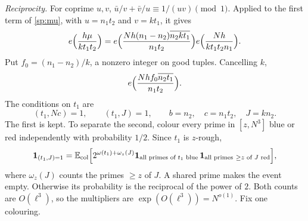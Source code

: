 \emph{Reciprocity.} For coprime $u,v$, $\bar u/v+\bar v/u\equiv1/(uv)\pmod1$.
Applied to the first term of \eqref{sp:mu}, with $u=n_1t_2$ and $v=kt_1$, it
gives
\[
 e\Bigl(\frac{h\mu}{kt_1t_2}\Bigr)
 =e\Bigl(\frac{Nh(n_1-n_2)\overline{n_2kt_1}}{n_1t_2}\Bigr)
  e\Bigl(\frac{Nh}{kt_1t_2n_1}\Bigr).
\]
Put $f_0=(n_1-n_2)/k$, a nonzero integer on good tuples. Cancelling $k$,
\begin{equation}\label{sp:phase}
 e\Bigl(\frac{Nhf_0\overline{n_2t_1}}{n_1t_2}\Bigr).
\end{equation}
The conditions on $t_1$ are
\begin{equation}\label{sp:inner-cond}
 (t_1,Nc)=1,\qquad(t_1,J)=1,\qquad b=n_2,\quad c=n_1t_2,\quad J=kn_2 .
\end{equation}
The first is kept. To separate the second, colour every prime in
$[z,N^3]$ blue or red independently with probability $1/2$. Since $t_1$ is
$z$-rough,
\begin{equation}\label{sp:colour}
 \mathbf1_{(t_1,J)=1}=\mathbb E_{\rm col}\Bigl[2^{\omega(t_1)+\omega_z(J)}
 \mathbf1_{\text{all primes of }t_1\text{ blue}}\,
 \mathbf1_{\text{all primes}\ \ge z\text{ of }J\text{ red}}\Bigr],
\end{equation}
where $\omega_z(J)$ counts the primes $\ge z$ of $J$. A shared prime makes
the event empty. Otherwise its probability is the reciprocal of the power of
$2$. Both counts are $O(\ell^3)$, so the multipliers are
$\exp(O(\ell^3))=N^{o(1)}$. Fix one colouring.

